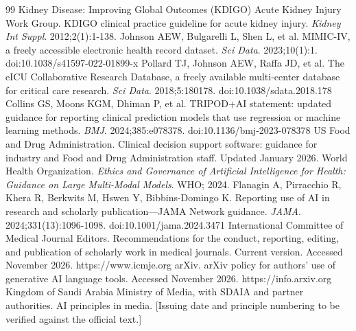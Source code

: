 \documentclass[11pt]{article}
\begin{document}
\begin{thebibliography}{99}
 Kidney Disease: Improving Global Outcomes (KDIGO) Acute Kidney Injury Work Group. KDIGO clinical practice guideline for acute kidney injury. \textit{Kidney Int Suppl}. 2012;2(1):1-138.
 Johnson AEW, Bulgarelli L, Shen L, et al. MIMIC-IV, a freely accessible electronic health record dataset. \textit{Sci Data}. 2023;10(1):1. doi:10.1038/s41597-022-01899-x
 Pollard TJ, Johnson AEW, Raffa JD, et al. The eICU Collaborative Research Database, a freely available multi-center database for critical care research. \textit{Sci Data}. 2018;5:180178. doi:10.1038/sdata.2018.178
 Collins GS, Moons KGM, Dhiman P, et al. TRIPOD+AI statement: updated guidance for reporting clinical prediction models that use regression or machine learning methods. \textit{BMJ}. 2024;385:e078378. doi:10.1136/bmj-2023-078378
 US Food and Drug Administration. Clinical decision support software: guidance for industry and Food and Drug Administration staff. Updated January 2026.
 World Health Organization. \textit{Ethics and Governance of Artificial Intelligence for Health: Guidance on Large Multi-Modal Models}. WHO; 2024.
 Flanagin A, Pirracchio R, Khera R, Berkwits M, Hswen Y, Bibbins-Domingo K. Reporting use of AI in research and scholarly publication---JAMA Network guidance. \textit{JAMA}. 2024;331(13):1096-1098. doi:10.1001/jama.2024.3471
 International Committee of Medical Journal Editors. Recommendations for the conduct, reporting, editing, and publication of scholarly work in medical journals. Current version. Accessed November 2026. https://www.icmje.org
 arXiv. arXiv policy for authors' use of generative AI language tools. Accessed November 2026. https://info.arxiv.org
 Kingdom of Saudi Arabia Ministry of Media, with SDAIA and partner authorities. AI principles in media. [Issuing date and principle numbering to be verified against the official text.]
\end{thebibliography}
\end{document}
